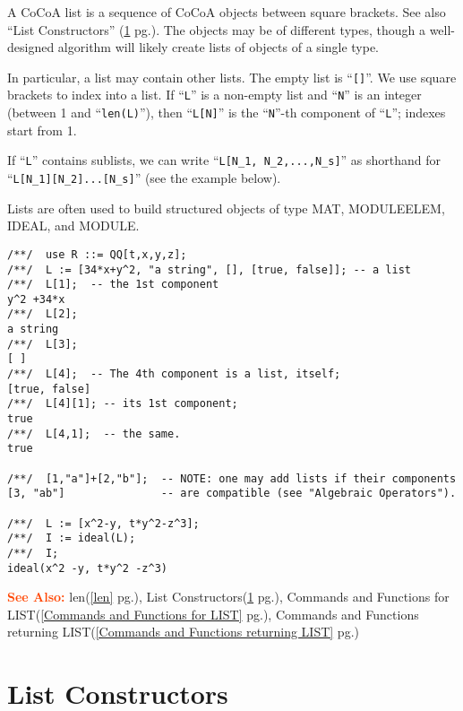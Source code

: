 \documentclass[a4paper]{mybook}
\newcommand\SeeAlso{\par\textcolor{OrangeRed}{\textbf{\large See Also: }}}
\begin{document}
        
A CoCoA list is a sequence of CoCoA objects between square brackets.
See also ``List Constructors'' (\ref{List Constructors} pg.\pageref{List Constructors}).  The objects may be of different
types, though a well-designed algorithm will likely create lists of
objects of a single type.
\par 
In particular, a list may contain other lists.  The empty list is ``\verb&[]&''.
We use square brackets to index into a list.  If ``\verb&L&'' is a non-empty
list and ``\verb&N&'' is an integer (between 1 and ``\verb&len(L)&''), then ``\verb&L[N]&'' is
the ``\verb&N&''-th component of ``\verb&L&''; indexes start from 1.
\par 
If ``\verb&L&'' contains sublists, we can write ``\verb&L[N_1, N_2,...,N_s]&'' as
shorthand for ``\verb&L[N_1][N_2]...[N_s]&'' (see the example below).
\par 
Lists are often used to build structured objects of type
MAT, MODULEELEM, IDEAL, and MODULE.
\begin{Verbatim}[label=example, rulecolor=\color{PineGreen}, frame=single]
/**/  use R ::= QQ[t,x,y,z];
/**/  L := [34*x+y^2, "a string", [], [true, false]]; -- a list
/**/  L[1];  -- the 1st component
y^2 +34*x
/**/  L[2];
a string
/**/  L[3];
[ ]
/**/  L[4];  -- The 4th component is a list, itself;
[true, false]
/**/  L[4][1]; -- its 1st component;
true
/**/  L[4,1];  -- the same.
true

/**/  [1,"a"]+[2,"b"];  -- NOTE: one may add lists if their components
[3, "ab"]               -- are compatible (see "Algebraic Operators").

/**/  L := [x^2-y, t*y^2-z^3];
/**/  I := ideal(L);
/**/  I;
ideal(x^2 -y, t*y^2 -z^3)
\end{Verbatim}


\SeeAlso %
  len(\ref{len} pg.\pageref{len}), 
    List Constructors(\ref{List Constructors} pg.\pageref{List Constructors}), 
    Commands and Functions for LIST(\ref{Commands and Functions for LIST} pg.\pageref{Commands and Functions for LIST}), 
    Commands and Functions returning LIST(\ref{Commands and Functions returning LIST} pg.\pageref{Commands and Functions returning LIST})

\section{List Constructors}
\label{List Constructors}
\end{document}

